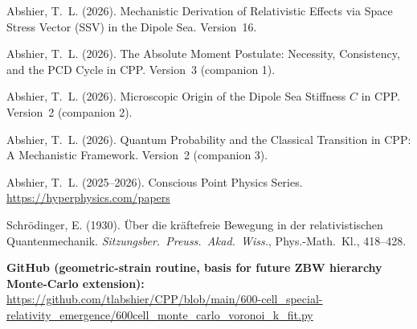 \documentclass[12pt]{article}
\begin{document}
\begin{enumerate}[label={[\arabic*]}]
  \item Abshier, T.~L. (2026). Mechanistic Derivation of Relativistic
    Effects via Space Stress Vector (SSV) in the Dipole Sea.  Version~16.

  \item Abshier, T.~L. (2026). The Absolute Moment Postulate: Necessity,
    Consistency, and the PCD Cycle in CPP.  Version~3 (companion 1).

  \item Abshier, T.~L. (2026). Microscopic Origin of the Dipole Sea
    Stiffness $C$ in CPP.  Version~2 (companion 2).

  \item Abshier, T.~L. (2026). Quantum Probability and the Classical
    Transition in CPP: A Mechanistic Framework.  Version~2 (companion 3).

  \item Abshier, T.~L. (2025--2026). Conscious Point Physics Series.
    \url{https://hyperphysics.com/papers}

  \item Schr\"odinger, E. (1930). \"Uber die kr\"aftefreie Bewegung in der
    relativistischen Quantenmechanik. \textit{Sitzungsber.\ Preuss.\ Akad.\
    Wiss.}, Phys.-Math.\ Kl., 418--428.
\end{enumerate}

\bigskip
\noindent\textbf{GitHub (geometric-strain routine, basis for future
ZBW hierarchy Monte-Carlo extension):}\\
\url{https://github.com/tlabshier/CPP/blob/main/600-cell_special-relativity_emergence/600cell_monte_carlo_voronoi_k_fit.py}
\end{document}
